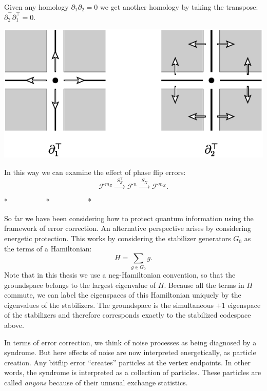 \documentclass[11pt,twoside,openright]{report}
\newcommand{\Field}{\mathcal{F}}
\begin{document}
Given any homology $\partial_1 \partial_2 = 0$
we get another homology by taking the transpose:
$\partial_2^\top \partial_1^\top = 0.$
\begin{center}
\includegraphics{pic-cobdy.pdf}
\end{center}
In this way we can examine the effect of phase flip errors:
$$
    \Field^{m_Z} \xrightarrow{\ \ S_Z^\top\ \ } 
    \Field^{n} \xrightarrow{\ \ S_X\ \ } 
    \Field^{m_X}.
$$


\begin{center}
* \ \ \ \ \ \ \ \ \ \ * \ \ \ \ \ \ \ \ \ \ *
\end{center}

So far we have been considering how to protect quantum information
using the framework of error correction.
An alternative perspective arises by considering energetic
protection.
This works by considering the stabilizer generators $G_0$ as
the terms of a Hamiltonian:
$$
    H = \sum_{g\in G_0} g.
$$
Note that in this thesis we use a neg-Hamiltonian convention,
so that the groundspace belongs to the largest eigenvalue of $H$.
Because all the terms in $H$ commute, we can label the eigenspaces of
this Hamiltonian uniquely by the eigenvalues of the stabilizers.
The groundspace is the simultaneous $+1$ eigenspace of the stabilizers
and therefore corresponds exactly to the stabilized codespace above.

In terms of error correction,
we think of noise processes as being diagnosed by a syndrome. 
But here 
effects of noise are now interpreted energetically, as particle creation.
Any bitflip error ``creates'' particles at the vertex endpoints.
In other words, the syndrome is interpreted as a collection of particles.
These particles are called \emph{anyons}
because of their unusual exchange statistics.
\end{document}
